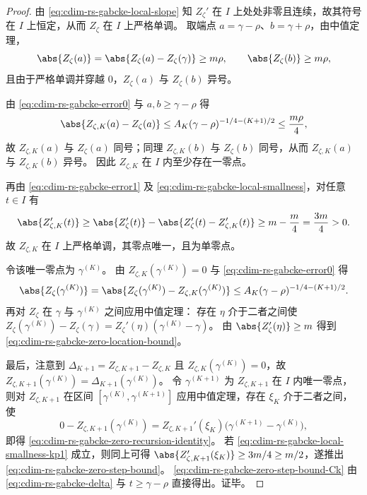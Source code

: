 \begin{proof}
由 \eqref{eq:cdim-rs-gabcke-local-slope} 知 \(Z_{\zeta}'\) 在 \(I\) 上处处非零且连续，故其符号在 \(I\) 上恒定，从而 \(Z_{\zeta}\) 在 \(I\) 上严格单调。
取端点 \(a=\gamma-\rho\)、\(b=\gamma+\rho\)，由中值定理，
\[
\abs{Z_{\zeta}(a)}=\abs{Z_{\zeta}(a)-Z_{\zeta}(\gamma)}\ge m\rho,
\qquad
\abs{Z_{\zeta}(b)}\ge m\rho,
\]
且由于严格单调并穿越 \(0\)，\(Z_{\zeta}(a)\) 与 \(Z_{\zeta}(b)\) 异号。
\par
由 \eqref{eq:cdim-rs-gabcke-error0} 与 \(a,b\ge \gamma-\rho\) 得
\[
\abs{Z_{\zeta,K}(a)-Z_{\zeta}(a)}
\le A_K(\gamma-\rho)^{-1/4-(K+1)/2}\le \frac{m\rho}{4},
\]
故 \(Z_{\zeta,K}(a)\) 与 \(Z_{\zeta}(a)\) 同号；同理 \(Z_{\zeta,K}(b)\) 与 \(Z_{\zeta}(b)\) 同号，从而 \(Z_{\zeta,K}(a)\) 与 \(Z_{\zeta,K}(b)\) 异号。
因此 \(Z_{\zeta,K}\) 在 \(I\) 内至少存在一零点。
\par
再由 \eqref{eq:cdim-rs-gabcke-error1} 及 \eqref{eq:cdim-rs-gabcke-local-smallness}，对任意 \(t\in I\) 有
\[
\abs{Z_{\zeta,K}'(t)}
\ge \abs{Z_{\zeta}'(t)}-\abs{Z_{\zeta}'(t)-Z_{\zeta,K}'(t)}
\ge m-\frac{m}{4}=\frac{3m}{4}>0.
\]
故 \(Z_{\zeta,K}\) 在 \(I\) 上严格单调，其零点唯一，且为单零点。
\par
令该唯一零点为 \(\gamma^{(K)}\)。
由 \(Z_{\zeta,K}(\gamma^{(K)})=0\) 与 \eqref{eq:cdim-rs-gabcke-error0} 得
\[
\abs{Z_{\zeta}(\gamma^{(K)})}
=\abs{Z_{\zeta}(\gamma^{(K)})-Z_{\zeta,K}(\gamma^{(K)})}
\le A_K(\gamma-\rho)^{-1/4-(K+1)/2}.
\]
再对 \(Z_{\zeta}\) 在 \(\gamma\) 与 \(\gamma^{(K)}\) 之间应用中值定理：
存在 \(\eta\) 介于二者之间使 \(Z_{\zeta}(\gamma^{(K)})-Z_{\zeta}(\gamma)=Z_{\zeta}'(\eta)(\gamma^{(K)}-\gamma)\)。
由 \(\abs{Z_{\zeta}'(\eta)}\ge m\) 得到 \eqref{eq:cdim-rs-gabcke-zero-location-bound}。
\par
最后，注意到 \(\Delta_{K+1}=Z_{\zeta,K+1}-Z_{\zeta,K}\) 且 \(Z_{\zeta,K}(\gamma^{(K)})=0\)，故
\(
Z_{\zeta,K+1}(\gamma^{(K)})=\Delta_{K+1}(\gamma^{(K)})
\)。
令 \(\gamma^{(K+1)}\) 为 \(Z_{\zeta,K+1}\) 在 \(I\) 内唯一零点，则对 \(Z_{\zeta,K+1}\) 在区间 \([\gamma^{(K)},\gamma^{(K+1)}]\) 应用中值定理，存在 \(\xi_K\) 介于二者之间，使
\[
0-Z_{\zeta,K+1}(\gamma^{(K)})
=Z_{\zeta,K+1}'(\xi_K)\bigl(\gamma^{(K+1)}-\gamma^{(K)}\bigr),
\]
即得 \eqref{eq:cdim-rs-gabcke-zero-recursion-identity}。
若 \eqref{eq:cdim-rs-gabcke-local-smallness-kp1} 成立，则同上可得 \(\abs{Z_{\zeta,K+1}'(\xi_K)}\ge 3m/4\ge m/2\)，遂推出 \eqref{eq:cdim-rs-gabcke-zero-step-bound}。
\eqref{eq:cdim-rs-gabcke-zero-step-bound-Ck} 由 \eqref{eq:cdim-rs-gabcke-delta} 与 \(t\ge \gamma-\rho\) 直接得出。证毕。
\end{proof}

